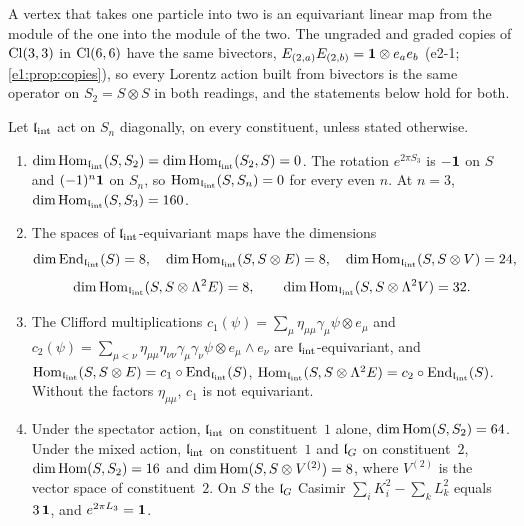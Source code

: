 A vertex that takes one particle into two is an equivariant linear map from the module of the one into the module of the two. The
ungraded and graded copies of $\mathrm{Cl}(3,3)$ in $\mathrm{Cl}(6,6)$ have the same bivectors, $E_{(2,a)}E_{(2,b)}=\mathbf 1\otimes e_ae_b$ (e2-1;
\cref{e1:prop:copies}), so every Lorentz action built from bivectors is the same operator on $S_2=S\otimes S$ in both readings, and the
statements below hold for both.

\begin{proposition}[Vertices]
\label{e2:prop:vertex}
Let $\mathfrak l_{\rm int}$ act on $S_n$ diagonally, on every constituent, unless stated otherwise.
\begin{enumerate}[label=(\roman*),leftmargin=2.2em]
\item $\dim\operatorname{Hom}_{\mathfrak l_{\rm int}}(S,S_2)=\dim\operatorname{Hom}_{\mathfrak l_{\rm int}}(S_2,S)=0$. The rotation $e^{2\pi S_3}$ is $-\mathbf 1$ on $S$ and $(-1)^n\mathbf 1$ on $S_n$, so
$\operatorname{Hom}_{\mathfrak l_{\rm int}}(S,S_n)=0$ for every even $n$. At $n=3$, $\dim\operatorname{Hom}_{\mathfrak l_{\rm int}}(S,S_3)=160$.
\item The spaces of $\mathfrak l_{\rm int}$-equivariant maps have the dimensions
\[
\dim\operatorname{End}_{\mathfrak l_{\rm int}}(S)=8,\quad\dim\operatorname{Hom}_{\mathfrak l_{\rm int}}(S,S\otimes E)=8,\quad\dim\operatorname{Hom}_{\mathfrak l_{\rm int}}(S,S\otimes V)=24,
\]
\[
\dim\operatorname{Hom}_{\mathfrak l_{\rm int}}(S,S\otimes\Lambda^2E)=8,\qquad\dim\operatorname{Hom}_{\mathfrak l_{\rm int}}(S,S\otimes\Lambda^2V)=32.
\]
\item The Clifford multiplications $c_1(\psi)=\sum_\mu\eta_{\mu\mu}\gamma_\mu\psi\otimes e_\mu$ and
$c_2(\psi)=\sum_{\mu<\nu}\eta_{\mu\mu}\eta_{\nu\nu}\gamma_\mu\gamma_\nu\psi\otimes e_\mu\wedge e_\nu$ are $\mathfrak l_{\rm int}$-equivariant, and
$\operatorname{Hom}_{\mathfrak l_{\rm int}}(S,S\otimes E)=c_1\circ\operatorname{End}_{\mathfrak l_{\rm int}}(S)$, $\operatorname{Hom}_{\mathfrak l_{\rm int}}(S,S\otimes\Lambda^2E)=c_2\circ\operatorname{End}_{\mathfrak l_{\rm int}}(S)$. Without the factors $\eta_{\mu\mu}$, $c_1$ is not
equivariant.
\item Under the spectator action, $\mathfrak l_{\rm int}$ on constituent~$1$ alone, $\dim\operatorname{Hom}(S,S_2)=64$. Under the mixed action, $\mathfrak l_{\rm int}$ on constituent~$1$ and
$\mathfrak l_G$ on constituent~$2$, $\dim\operatorname{Hom}(S,S_2)=16$ and $\dim\operatorname{Hom}(S,S\otimes V^{(2)})=8$, where $V^{(2)}$ is the vector space of constituent~$2$. On $S$
the $\mathfrak l_G$ Casimir $\sum_iK_i^2-\sum_kL_k^2$ equals $3\,\mathbf 1$, and $e^{2\pi L_3}=\mathbf 1$.
\end{enumerate}
\end{proposition}

